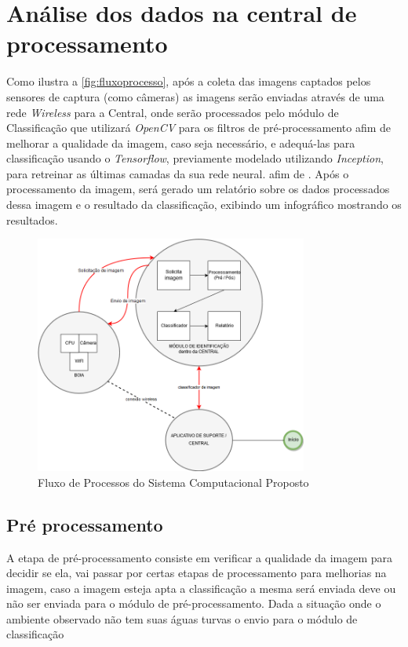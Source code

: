 \section{Análise dos dados na central de processamento}

Como ilustra a \autoref{fig:fluxoprocesso}, após a coleta das imagens captados pelos sensores de captura (como câmeras) as imagens serão enviadas através de uma rede \textit{Wireless} para a Central, onde serão processados pelo módulo de Classificação que utilizará \textit{OpenCV} para os filtros de pré-processamento afim de melhorar a qualidade da imagem, caso seja necessário, e adequá-las para classificação usando o \textit{Tensorflow}, previamente modelado utilizando \textit{Inception}, para retreinar as últimas camadas da sua rede neural. afim de . 
Após o processamento da imagem, será gerado um relatório sobre os dados processados dessa imagem e o resultado da classificação, exibindo um infográfico mostrando os resultados.


\begin{figure}[ht]
	\centering
    \caption{\label{fig:fluxoprocesso}Fluxo de Processos do Sistema Computacional Proposto}
	\includegraphics[width = 0.8\textwidth]{resources/fluxo-de-processo.png}
\end{figure}

\subsection{Pré processamento}
A etapa de pré-processamento consiste em verificar a qualidade da imagem para decidir se ela, vai passar por certas etapas de processamento para melhorias na imagem, caso a imagem esteja apta a classificação a mesma será enviada  deve ou não ser enviada para o módulo de pré-processamento. Dada a situação onde o ambiente observado não tem suas águas turvas o envio para o módulo de classificação


